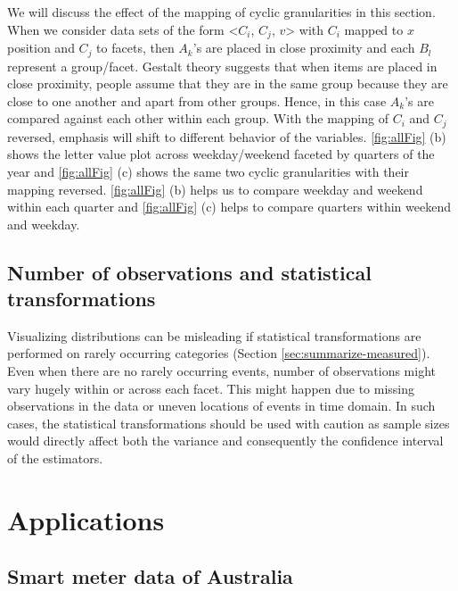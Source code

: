 \documentclass[12pt]{article}
\begin{document}
We will discuss the effect of the mapping of cyclic granularities in this section. When we consider data sets of the form \textless{}\(C_i\), \(C_j\), \(v\)\textgreater{} with \(C_i\) mapped to \(x\) position and \(C_j\) to facets, then \(A_k\)'s are placed in close proximity and each \(B_l\) represent a group/facet. Gestalt theory suggests that when items are placed in close proximity, people assume that they are in the same group because they are close to one another and apart from other groups. Hence, in this case \(A_k\)'s are compared against each other within each group. With the mapping of \(C_i\) and \(C_j\) reversed, emphasis will shift to different behavior of the variables. \autoref{fig:allFig} (b) shows the letter value plot across weekday/weekend faceted by quarters of the year and \autoref{fig:allFig} (c) shows the same two cyclic granularities with their mapping reversed. \autoref{fig:allFig} (b) helps us to compare weekday and weekend within each quarter and \autoref{fig:allFig} (c) helps to compare quarters within weekend and weekday.

\hypertarget{number-of-observations-and-statistical-transformations}{%
\subsection{Number of observations and statistical transformations}\label{number-of-observations-and-statistical-transformations}}

Visualizing distributions can be misleading if statistical transformations are performed on rarely occurring categories (Section \ref{sec:summarize-measured}). Even when there are no rarely occurring events, number of observations might vary hugely within or across each facet. This might happen due to missing observations in the data or uneven locations of events in time domain. In such cases, the statistical transformations should be used with caution as sample sizes would directly affect both the variance and consequently the confidence interval of the estimators.

\hypertarget{sec:application}{%
\section{Applications}\label{sec:application}}

\hypertarget{sec:smartmeter}{%
\subsection{Smart meter data of Australia}\label{sec:smartmeter}}
\end{document}
